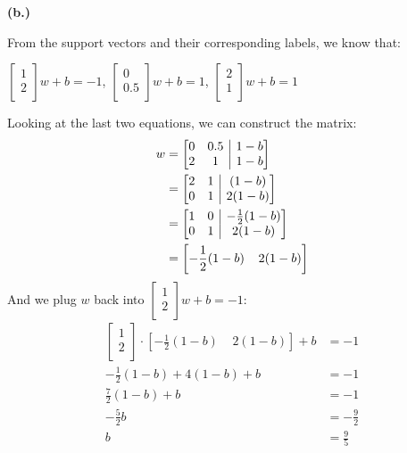 \documentclass{article}
\begin{document}
\pagebreak
\vspace{5mm}\textbf{(b.)}
\begin{flushleft}
    From the support vectors and their corresponding labels, we know that:
\end{flushleft}
\begin{center}
    $\begin{bmatrix}1 \\ 2 \\\end{bmatrix} w + b = -1$,
    $\begin{bmatrix}0 \\ 0.5 \\\end{bmatrix} w + b = 1$,
    $\begin{bmatrix}2 \\ 1 \\\end{bmatrix} w + b = 1$
\end{center}
Looking at the last two equations, we can construct the matrix:
\begin{align*}
    w &= \left[\begin{array}{@{}cc|c@{}}
        0 & 0.5 & 1-b \\
        2 & 1 & 1-b
    \end{array}\right]
    \\&= \left[\begin{array}{@{}cc|c@{}}
        2 & 1 & (1-b) \\
        0 & 1 & 2(1-b)
    \end{array}\right]
    \\&= \left[\begin{array}{@{}cc|c@{}}
        1 & 0 & -\frac{1}{2}(1-b) \\
        0 & 1 & 2(1-b)
    \end{array}\right]
    \\&= \left[-\frac{1}{2}(1-b) \;\;\;\; 2(1-b)\right]
\end{align*}
And we plug $w$ back into $\begin{bmatrix}1 \\ 2 \\\end{bmatrix} w + b = -1$:
\begin{align*}
    \begin{bmatrix}1 \\ 2 \\\end{bmatrix} \cdot \left[-\frac{1}{2}(1-b) \;\;\;\; 2(1-b)\right] + b &= -1
    \\ -\frac{1}{2}(1-b) + 4(1-b) + b &= -1
    \\ \frac{7}{2}(1-b) + b &= -1
    \\ -\frac{5}{2} b &= -\frac{9}{2}
    \\ b &= \frac{9}{5}
\end{align*}
\begin{center}
\end{center}
\end{document}
